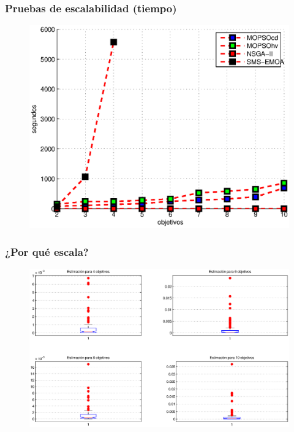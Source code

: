 \documentclass[10pt,compress]{beamer}
\begin{document}
\begin{frame}
\frametitle{Pruebas de escalabilidad (tiempo)} 
 \begin{figure}
      \begin{center}
	  \includegraphics[scale=.6]{tiempoEscala.eps}
      \end{center}
  \end{figure}
\end{frame}

\begin{frame}
\frametitle{¿Por qu\'e escala?}
\begin{figure}
      \begin{center}
	  \includegraphics[scale=.35]{pqescala.eps}
      \end{center}
  \end{figure}
\end{frame}
\end{document}
